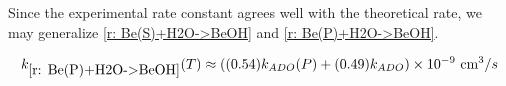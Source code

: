 Since the experimental rate constant agrees well with the theoretical rate, we may generalize  \ref{r: Be(S)+H2O->BeOH} and \ref{r: Be(P)+H2O->BeOH}.

\begin{equation}
	k_{\ref{r: Be(P)+H2O->BeOH}}(T) \approx ((0.54)k_{ADO}(P) + (0.49)k_{ADO}) \times 10^{-9}\text{ cm}^3/s
	\label{eq: k Be+H2O(T)}
\end{equation}

